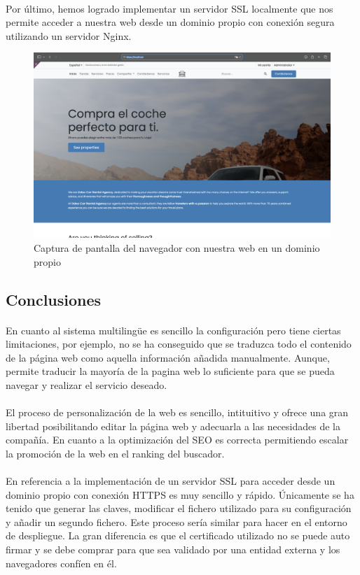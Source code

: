 \paragraph{}
Por último, hemos logrado implementar un servidor SSL localmente que nos permite acceder a nuestra web desde un dominio propio con conexión segura utilizando un servidor Nginx. 
\begin{figure}[h]
    \centering
    \includegraphics[width=1\linewidth]{SSL.png}
    \caption{Captura de pantalla del navegador con nuestra web en un dominio propio}
\end{figure}
\subsection{Conclusiones}
\paragraph{}
En cuanto al sistema multilingüe es sencillo la configuración pero tiene ciertas limitaciones, por ejemplo, no se ha conseguido que se traduzca todo el contenido de la página web como aquella información añadida manualmente. Aunque, permite traducir la mayoría de la pagina web lo suficiente para que se pueda navegar y realizar el servicio deseado. 
\paragraph{}
El proceso de personalización de la web es sencillo, intituitivo y ofrece una gran libertad posibilitando editar la página web y adecuarla a las necesidades de la compañía. En cuanto a la optimización del SEO es correcta permitiendo escalar la promoción de la web en el ranking del buscador. 
\paragraph{}
En referencia a la implementación de un servidor SSL para acceder desde un dominio propio con conexión HTTPS es muy sencillo y rápido. Únicamente se ha tenido que generar las claves, modificar el fichero utilizado para su configuración y añadir un segundo fichero. Este proceso sería similar para hacer en el entorno de despliegue. La gran diferencia es que el certificado utilizado no se puede auto firmar y se debe comprar para que sea validado por una entidad externa y los navegadores confíen en él.



